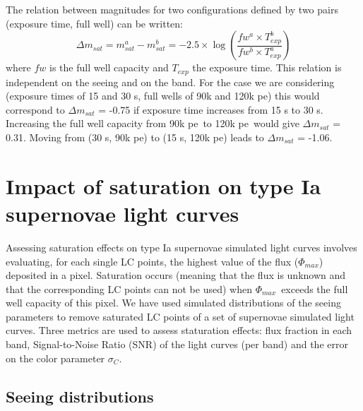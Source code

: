 \documentclass[\docopts]{\docclass}
\newcommand{\pe}{{pe}}
\newcommand{\phimax}{{$\Phi_{max}$}}
\newcommand{\colorerr}{{$\sigma_C$}}
\begin{document}
The relation between magnitudes for two configurations defined by two pairs (exposure time, full well) can be written:
\begin{equation}
\Delta m_{sat} = m^a_{sat}-m^b_{sat} = -2.5 \times \log\left(\frac{fw^a\times T_{exp}^b}{fw^b \times T_{exp}^a}\right)
 \end{equation}
where $fw$ is the full well capacity and $T_{exp}$ the exposure time. This relation is independent on the seeing and on the band. For the case we are considering (exposure times of 15 and 30 s, full wells of 90k and 120k \pe) this would correspond to  $\Delta m_{sat}$ = -0.75  if exposure time increases from 15 s to 30 s. Increasing the full well capacity from 90k \pe~to 120k \pe~would give $\Delta m_{sat}$ = 0.31. Moving from (30 s, 90k \pe) to (15 s, 120k \pe) leads to $\Delta m_{sat}$ = -1.06. 




\section{Impact of saturation on type Ia supernovae light curves}
\label{sec:sn_saturation}
Assessing saturation effects on type Ia supernovae simulated light curves involves evaluating, for each single LC points, the highest value of the flux (\phimax) deposited in a pixel. Saturation occurs (meaning that the flux is unknown and that the corresponding LC points can not be used) when \phimax~exceeds the full well capacity of this pixel. We have used simulated distributions of the seeing parameters to remove saturated LC points of a set of supernovae simulated light curves. Three metrics are used to assess staturation effects: flux fraction in each band, Signal-to-Noise Ratio (SNR) of the light curves (per band) and the error on the color parameter \colorerr.

\subsection{Seeing distributions}
\end{document}
